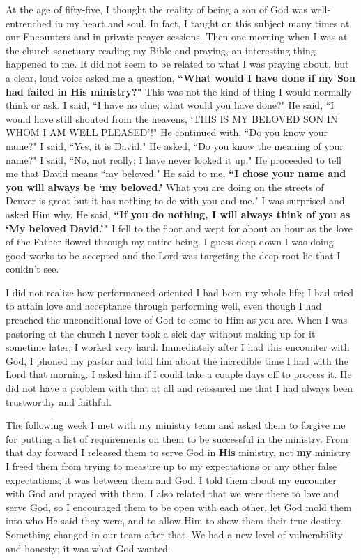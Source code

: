 \documentclass[oneside]{book}
\begin{document}
At the age of fifty-five, I thought the reality of being a son of God was well-entrenched in my heart and soul. In fact, I taught on this subject many times at our Encounters and in private prayer sessions. Then one morning when I was at the church sanctuary reading my Bible and praying, an interesting thing happened to me. It did not seem to be related to what I was praying about, but a clear, loud voice asked me a question, \textbf{``What would I have done if my Son had failed in His ministry?"} This was not the kind of thing I would normally think or ask. I said, ``I have no clue; what would you have done?" He said, ``I would have still shouted from the heavens, `THIS IS MY BELOVED SON IN WHOM I AM WELL PLEASED'!" He continued with, ``Do you know your name?" I said, ``Yes, it is David." He asked, ``Do you know the meaning of your name?" I said, ``No, not really; I have never looked it up." He proceeded to tell me that David means ``my beloved." He said to me, \textbf{``I chose your name and you will always be `my beloved.'} What you are doing on the streets of Denver is great but it has nothing to do with you and me." I was surprised and asked Him why. He said, \textbf{``If you do nothing, I will always think of you as `My beloved David.'"} I fell to the floor and wept for about an hour as the love of the Father flowed through my entire being. I guess deep down I was doing good works to be accepted and the Lord was targeting the deep root lie that I couldn't see.

I did not realize how performanced-oriented I had been my whole life; I had tried to attain love and acceptance through performing well, even though I had preached the unconditional love of God to come to Him as you are. When I was pastoring at the church I never took a sick day without making up for it sometime later; I worked very hard. Immediately after I had this encounter with God, I phoned my pastor and told him about the incredible time I had with the Lord that morning. I asked him if I could take a couple days off to process it. He did not have a problem with that at all and reassured me that I had always been trustworthy and faithful.

The following week I met with my ministry team and asked them to forgive me for putting a list of requirements on them to be successful in the ministry. From that day forward I released them to serve God in \textbf{His} ministry, not \textbf{my} ministry. I freed them from trying to measure up to my expectations or any other false expectations; it was between them and God. I told them about my encounter with God and prayed with them. I also related that we were there to love and serve God, so I encouraged them to be open with each other, let God mold them into who He said they were, and to allow Him to show them their true destiny. Something changed in our team after that. We had a new level of vulnerability and honesty; it was what God wanted. 
\end{document}
